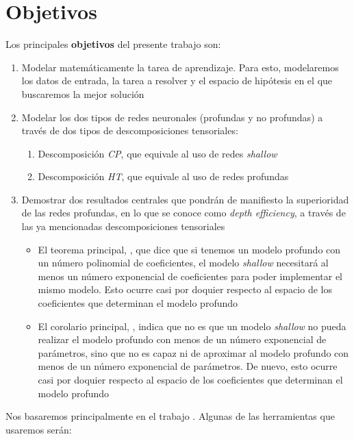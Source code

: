 \section{Objetivos}

Los principales \textbf{objetivos} del presente trabajo son:

\begin{enumerate}
    \item Modelar matemáticamente la tarea de aprendizaje. Para esto, modelaremos los datos de entrada, la tarea a resolver y el espacio de hipótesis en el que buscaremos la mejor solución
    \item Modelar los dos tipos de redes neuronales (profundas y no profundas) a través de dos tipos de descomposiciones tensoriales:
        \begin{enumerate}
            \item Descomposición \textit{CP}, que equivale al uso de redes \textit{shallow}
            \item Descomposición \textit{HT}, que equivale al uso de redes profundas
        \end{enumerate}
    \item Demostrar dos resultados centrales que pondrán de manifiesto la superioridad de las redes profundas, en lo que se conoce como \textit{depth efficiency}, a través de las ya mencionadas descomposiciones tensoriales
        \begin{itemize}
            \item El teorema principal, , que dice que si tenemos un modelo profundo con un número polinomial de coeficientes, el modelo \textit{shallow} necesitará al menos un número exponencial de coeficientes para poder implementar el mismo modelo. Esto ocurre casi por doquier respecto al espacio de los coeficientes que determinan el modelo profundo
            \item El corolario principal, , indica que no es que un modelo \textit{shallow} no pueda realizar el modelo profundo con menos de un número exponencial de parámetros, sino que no es capaz ni de aproximar al modelo profundo con menos de un número exponencial de parámetros. De nuevo, esto ocurre casi por doquier respecto al espacio de los coeficientes que determinan el modelo profundo
        \end{itemize}
\end{enumerate}

Nos basaremos principalmente en el trabajo \cite{matematicas:principal}. Algunas de las herramientas que usaremos serán:

